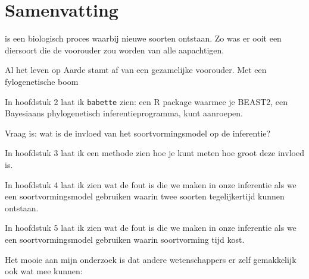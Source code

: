 \chapter*{Samenvatting}

\newpage

{



\noindent 
{} is een biologisch proces waarbij
nieuwe soorten ontstaan.
Zo was er ooit een diersoort die de voorouder zou worden
van alle aapachtigen.

Al het leven op Aarde stamt af van een gezamelijke voorouder.
Met een fylogenetische boom 

In hoofdstuk 2 laat ik \verb;babette; zien: een R package waarmee je BEAST2, 
een Bayesiaans phylogenetisch inferentieprogramma, kunt aanroepen.

Vraag is: wat is de invloed van het soortvormingsmodel op de inferentie?

In hoofdstuk 3 laat ik een methode zien hoe je kunt meten hoe groot deze invloed is.

In hoofdstuk 4 laat ik zien wat de fout is die we maken in onze inferentie als we
een soortvormingsmodel gebruiken waarin twee soorten tegelijkertijd kunnen ontstaan.

In hoofdstuk 5 laat ik zien wat de fout is die we maken in onze inferentie als we
een soortvormingsmodel gebruiken waarin soortvorming tijd kost.

Het mooie aan mijn onderzoek is dat andere wetenschappers er zelf gemakkelijk ook wat mee kunnen:


} %

